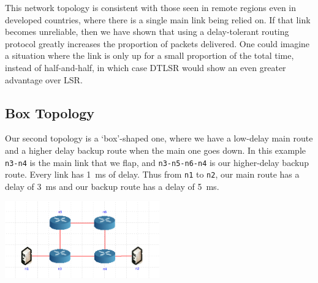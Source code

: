 \documentclass[withindex,glossary,openany]{cam-thesis}
\begin{document}
This network topology is consistent with those seen in remote regions even in developed countries, where there is a single main link being relied on. If that link becomes unreliable, then we have shown that using a delay-tolerant routing protocol greatly increases the proportion of packets delivered. One could imagine a situation where the link is only up for a small proportion of the total time, instead of half-and-half, in which case DTLSR would show an even greater advantage over LSR.


\subsection{Box Topology}

Our second topology is a `box'-shaped one, where we have a low-delay main route and a higher delay backup route when the main one goes down. In this example \texttt{n3-n4} is the main link that we flap, and \texttt{n3-n5-n6-n4} is our higher-delay backup route. Every link has \SI{1}{\ms} of delay. Thus from \texttt{n1} to \texttt{n2}, our main route has a delay of \SI{3}{\ms} and our backup route has a delay of \SI{5}{\ms}.

\begin{minipage}{1\textwidth} \centering
	\includegraphics[width=0.5\textwidth]{delay_box_topology}
\end{minipage}

\end{document}
